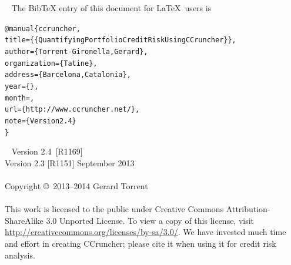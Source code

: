 \documentclass[11pt,fleqn]{book} %
\def\numversion{2.4}
\def\svnversion{R1169}
\begin{document}
~\vfill
The BibTeX entry of this document for \LaTeX\ users is
\begin{alltt}
@manual\{ccruncher,
    title = \{\{Quantifying Portfolio Credit Risk Using CCruncher\}\},
    author = \{Torrent-Gironella, Gerard\},
    organization = \{Tatine\},
    address = \{Barcelona, Catalonia\},
    year = \{\the\year\}, 
    month = \shortmonthname,
    url = \{http://www.ccruncher.net/\},
    note = \{Version \numversion\}
\}
\end{alltt}

~\vfill
\thispagestyle{empty}
\noindent Version \numversion\ [\svnversion] \monthname\ \the\year\\ 
\noindent Version 2.3 [R1151] September 2013\\ 
\\
\noindent Copyright \copyright\ 2013--2014 Gerard Torrent\\
\\
\noindent 
This work is licensed to the public under Creative Commons 
Attribution-ShareAlike 3.0 Unported License. To view a copy 
of this license, visit 
\url{http://creativecommons.org/licenses/by-sa/3.0/}.
We have invested much time and effort in creating CCruncher; 
please cite it when using it for credit risk analysis.


\pagestyle{empty}
\setcounter{tocdepth}{1}
\tableofcontents
\cleardoublepage
\pagestyle{fancy}
\end{document}
